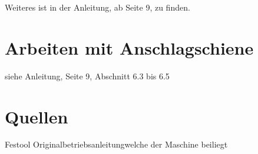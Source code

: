 \documentclass{\basedir/fablab-document}
\begin{document}
Weiteres ist in der Anleitung, ab Seite 9, zu finden.

\section{Arbeiten mit Anschlagschiene}
siehe Anleitung, Seite 9, Abschnitt 6.3 bis 6.5

\section{Quellen}
Festool \glqq Originalbetriebsanleitung\grqq welche der Maschine beiliegt
\end{document}
